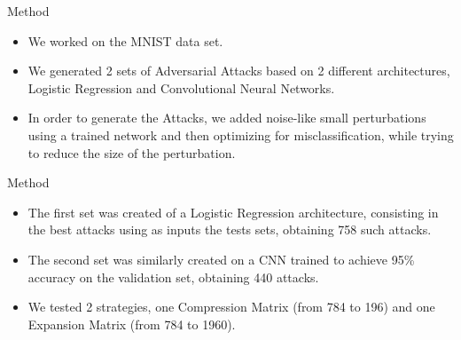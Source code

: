 \documentclass{beamer}
\begin{document}
	\begin{frame}{Method}
		\begin{block}{}
			\begin{itemize}
				\item We worked on the MNIST data set.
				\item We generated 2 sets of Adversarial Attacks based on 2 different architectures, Logistic Regression and Convolutional Neural Networks.
				\item In order to generate the Attacks, we added noise-like small perturbations using a trained network and then optimizing for misclassification, while trying to reduce the size of the perturbation.
			\end{itemize}
		\end{block}
	\end{frame}
	
	\begin{frame}{Method}
		\begin{block}{}
			\begin{itemize}
				\item The first set was created of a Logistic Regression architecture, consisting in the best attacks using as inputs the tests sets, obtaining 758 such attacks.
				\item The second set was similarly created on a CNN trained to achieve 95\% accuracy on the validation set, obtaining 440 attacks.
				\item We tested 2 strategies, one Compression Matrix (from 784 to 196) and one Expansion Matrix (from 784 to 1960).
			\end{itemize}
		\end{block}
	\end{frame}
	
\end{document}

